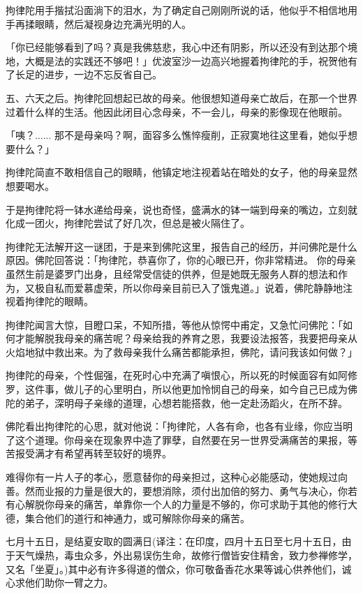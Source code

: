 \documentclass[12pt,twoside,openany]{book}
\begin{document}
拘律陀用手揩拭沿面淌下的泪水，为了确定自己刚刚所说的话，他似乎不相信地用手再揉眼睛，然后凝视身边充满光明的人。

「你已经能够看到了吗？真是我佛慈悲，我心中还有阴影，所以还没有到达那个境地，大概是法的实践还不够吧！」优波室沙一边高兴地握着拘律陀的手，祝贺他有了长足的进步，一边不忘反省自己。

五、六天之后。拘律陀回想起已故的母亲。他很想知道母亲亡故后，在那一个世界过着什么样的生活。他因此闭目心念母亲，不一会儿，母亲的影像现在他眼前。

「咦？......	那不是母亲吗？啊，面容多么憔悴瘦削，正寂寞地往这里看，她似乎想要什么？」

拘律陀简直不敢相信自己的眼睛，他镇定地注视着站在暗处的女子，他的母亲显然想要喝水。

于是拘律陀将一钵水递给母亲，说也奇怪，盛满水的钵一端到母亲的嘴边，立刻就化成一团火，拘律陀尝试了好几次，但总是被火隔住了。

拘律陀无法解开这一谜团，于是来到佛陀这里，报告自己的经历，并问佛陀是什么原因。佛陀回答说：「拘律陀，恭喜你了，你的心眼已开，你非常精进。  你的母亲虽然生前是婆罗门出身，且经常受信徒的供养，但是她既无服务人群的想法和作为，又极自私而爱慕虚荣，所以你母亲目前已入了饿鬼道。」说着，佛陀静静地注视着拘律陀的眼睛。

拘律陀闻言大惊，目瞪口呆，不知所措，等他从惊愕中甫定，又急忙问佛陀：「如何才能解脱我母亲的痛苦呢？母亲给我的养育之恩，我要设法报答，我要把母亲从火焰地狱中救出来。为了救母亲我什么痛苦都能承担，佛陀，请问我该如何做？」

拘律陀的母亲，个性倔强，在死时心中充满了嗔恨心，所以死的时候面容有如阿修罗，这件事，做儿子的心里明白，所以他更加怜悯自己的母亲，如今自己已成为佛陀的弟子，深明母子亲缘的道理，心想若能搭救，他一定赴汤蹈火，在所不辞。

佛陀看出拘律陀的心思，就对他说：「拘律陀，人各有命，也各有业缘，你应当明了这个道理。你母亲在现象界中造了罪孽，自然要在另一世界受满痛苦的果报，等苦报受满才有希望再转至较好的境界。

难得你有一片人子的孝心，愿意替你的母亲担过，这种心必能感动，使她规过向善。然而业报的力量是很大的，要想消除，须付出加倍的努力、勇气与决心，你若有心解脱你母亲的痛苦，单靠你一个人的力量是不够的，你可求助于其他的修行大德，集合他们的道行和神通力，或可解除你母亲的痛苦。

七月十五日，是结夏安取的圆满日(译注：在印度，四月十五日至七月十五日，由于天气燥热，毒虫众多，外出易误伤生命，故修行僧皆安住精舍，致力参禅修学，又名「坐夏」。)其中必有许多得道的僧众，你可敬备香花水果等诚心供养他们，诚心求他们助你一臂之力。
\end{document}

